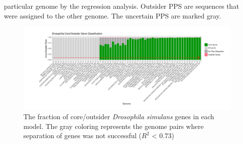 particular genome by the regression analysis. Outsider PPS are sequences that
were assigned to the other genome. The uncertain PPS are marked gray.
\begin{center}
\begin{figure}
\includegraphics[width=12cm]{figures/core_outsider_barplot_bootstrapped.pdf}
\caption{The fraction of core/outsider \textit{Drosophila simulans} genes in
each model. The gray coloring represents the genome pairs where separation of
genes was not successful ($R^2$ < 0.73)}
\label{fig:rsquared_barplot}
\end{figure}
\end{center}

